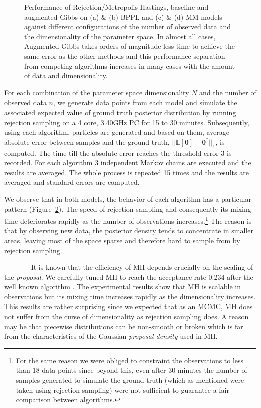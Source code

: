 \begin{figure}[tb!]
\begin{subfigure}{.48\textwidth}
  \caption{}
  \label{fig:mmm_dim_analysis}
\end{subfigure}
\caption{Performance of Rejection/Metropolis-Hastings, baseline and augmented Gibbs on (a) \& (b) BPPL and (c) \& (d) MM models against different configurations of the number of observed data and the dimensionality of the parameter space.  In almost all cases, Augmented Gibbs takes orders of magnitude less time to achieve the same error as the other methods and this performance separation from competing algorithms increases in many cases with the amount of data and dimensionality.}
\label{fig:results}
\end{figure}




For each combination of the parameter space dimensionality $N$ and the number 
of observed data $n$, we generate data points from each model and simulate the 
associated expected value of ground truth posterior distribution by running 
rejection sampling on a 4 core, 3.40GHz PC for 15 to 30 minutes.
Subsequently, using each algorithm, particles are generated and based on them, 
average absolute error between samples and the ground truth, $||\mathbb{E}[\boldsymbol\theta] - \boldsymbol\theta^*||_1$, is computed. 
The time till the absolute error reaches the threshold error 3 is recorded.
For each algorithm 3 independent Markov chains are executed and the results are averaged.
The whole process is repeated 15 times and the results are averaged and standard errors are computed. 


We observe that %
in both models, the behavior of each algorithm has a particular pattern 
(Figure~\ref{fig:results}). 
The speed of rejection sampling and consequently its mixing time deteriorates rapidly as the number of observations increases.\footnote{For the same reason we were obliged to constraint the observations to less than 18 data points since beyond this, even after 30 minutes the number of samples generated to simulate the ground truth (which as mentioned were taken using rejection sampling) were not sufficient to guarantee a fair comparison between algorithms.}
The reason is that by observing new data, the posterior density tends to concentrate in smaller areas, 
leaving most of the space sparse and therefore hard to sample from by rejection sampling.

-----------
It is known that the efficiency of MH depends crucially on the scaling of the 
\emph{proposal}.
We carefully tuned MH to reach the acceptance rate 0.234 after the well known algorithm \cite{Roberts:97}. 
The experimental results show that MH is scalable in observations but its mixing time increases rapidly as the dimensionality increases. 
This results are rather surprising since we expected that as an MCMC, MH does not suffer from the curse of dimensionality as rejection sampling does. 
A reason may be that piecewise distributions can be non-smooth or broken which is far from the characteristics of the Gaussian \emph{proposal density} used in MH. 


